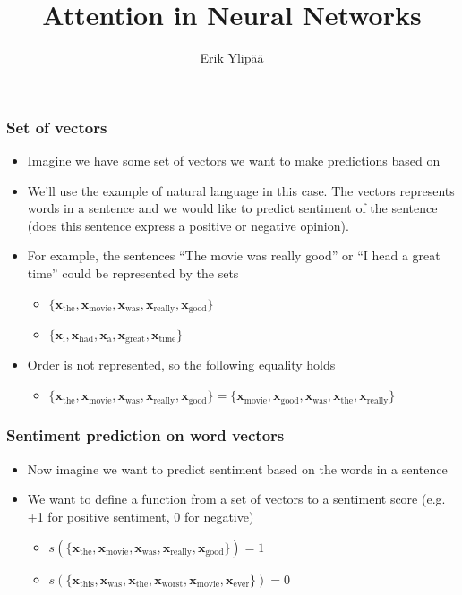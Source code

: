 \documentclass{beamer}
\title{Attention in Neural Networks} %
\author{Erik Ylipää}
\institute{Research Institutes of Sweden}
\renewcommand{\vec}[1]{{\boldsymbol{#1}}}
\newcommand{\svec}[2]{{\vec{#1}_{#2}}}
\begin{document}
\nobibliography{\jobname}

\frame{\titlepage}

  \begin{frame}
    \frametitle{Set of vectors}

    \begin{itemize}
    \item
    Imagine we have some set of vectors we want to make predictions based on
  \item
    We'll use the example of natural language in this case. The vectors represents words in a sentence and we would like to predict sentiment of the sentence (does this sentence express a positive or negative opinion).

  \item
    For example, the sentences ``The movie was really good'' or ``I head a great time'' could be represented by the sets
    \begin{itemize}
    \item $\{ \svec{x}{\text{the}}, \svec{x}{\text{movie}}, \svec{x}{\text{was}}, \svec{x}{\text{really}}, \svec{x}{\text{good}} \}$
      \item $\{ \svec{x}{\text{i}}, \svec{x}{\text{had}}, \svec{x}{\text{a}}, \svec{x}{\text{great}}, \svec{x}{\text{time}} \}$
    \end{itemize}
  \item Order is not represented, so the following equality holds
    \begin{itemize}
    \item $\{ \svec{x}{\text{the}}, \svec{x}{\text{movie}}, \svec{x}{\text{was}}, \svec{x}{\text{really}}, \svec{x}{\text{good}} \} = \{ \svec{x}{\text{movie}}, \svec{x}{\text{good}}, \svec{x}{\text{was}}, \svec{x}{\text{the}}, \svec{x}{\text{really}} \}$
    \end{itemize}
    \end{itemize}
  \end{frame}

  \begin{frame}
    \frametitle{Sentiment prediction on word vectors}
    \begin{itemize}
    \item Now imagine we want to predict sentiment based on the words in a sentence
    \item We want to define a function from a set of vectors to a sentiment score (e.g. +1 for positive sentiment, 0 for negative)
      \begin{itemize}

      \item $s(\{ \svec{x}{\text{the}}, \svec{x}{\text{movie}}, \svec{x}{\text{was}}, \svec{x}{\text{really}}, \svec{x}{\text{good}} \}) = 1$
        \item $s(\{ \svec{x}{\text{this}}, \svec{x}{\text{was}}, \svec{x}{\text{the}}, \svec{x}{\text{worst}}, \svec{x}{\text{movie}}, \svec{x}{\text{ever}} \}) = 0$
      \end{itemize}


    \end{itemize}
  \end{frame}
\end{document}

